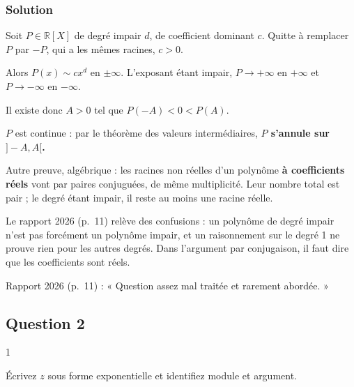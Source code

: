 \documentclass[11pt,a4paper]{article}
\begin{document}
\hypertarget{solution-36}{%
\subsubsection{Solution}\label{solution-36}}

Soit \(P\in\mathbb R[X]\) de degré impair \(d\), de coefficient dominant \(c\). Quitte à remplacer \(P\) par \(-P\), qui a les mêmes racines, \(c>0\).

Alors \(P(x)\sim cx^d\) en \(\pm\infty\). L'exposant étant impair, \(P\to+\infty\) en \(+\infty\) et \(P\to-\infty\) en \(-\infty\).

Il existe donc \(A>0\) tel que \(P(-A)<0<P(A)\).

\(P\) est continue : par le théorème des valeurs intermédiaires, \textbf{\(P\) s'annule sur \(]-A,A[\).}

\begin{methode}

Autre preuve, algébrique : les racines non réelles d'un polynôme \textbf{à coefficients réels} vont par paires conjuguées, de même multiplicité. Leur nombre total est pair ; le degré étant impair, il reste au moins une racine réelle.

\end{methode}

\begin{piege}

Le rapport 2026 (p.~11) relève des confusions : un polynôme de degré impair n'est pas forcément un polynôme impair, et un raisonnement sur le degré 1 ne prouve rien pour les autres degrés. Dans l'argument par conjugaison, il faut dire que les coefficients sont réels.

\end{piege}

\begin{jury}

Rapport 2026 (p.~11) : « Question assez mal traitée et rarement abordée. »

\end{jury}

\hypertarget{question-2-2}{%
\subsection{Question 2}\label{question-2-2}}

\begin{indication}{1}

Écrivez \(z\) sous forme exponentielle et identifiez module et argument.

\end{indication}
\end{document}

